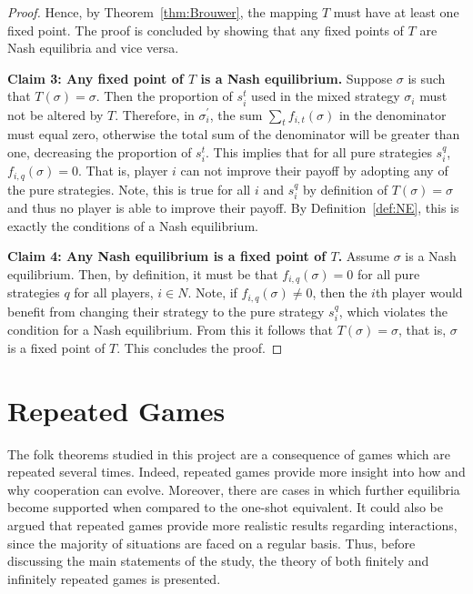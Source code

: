 \begin{proof}
    Hence, by Theorem~\ref{thm:Brouwer}, the mapping \(T\) must have at least
    one fixed point. The proof is concluded by showing that any fixed points of
    \(T\) are Nash equilibria and vice versa. 

    \textbf{Claim 3: Any fixed point of \(T\) is a Nash equilibrium.}
    Suppose \(\sigma \) is such that \(T(\sigma) = \sigma \). Then the
    proportion of \(s_{i}^{t}\) used in the mixed strategy \(\sigma_{i}\) must
    not be altered by \(T\). Therefore, in \(\sigma_{i}^{\prime}\), the sum
    \(\sum_{t}{f_{i,t}(\sigma)}\) in the denominator must equal zero, otherwise the total sum of the denominator will be greater than one,
    decreasing the proportion of \(s_{i}^{t}\). This implies that for all pure
    strategies \(s_{i}^{q}\), \(f_{i,q}(\sigma)=0\). That is, player \(i\) can not
    improve their payoff by adopting any of the pure strategies. Note, this is
    true for all \(i\) and \(s_{i}^{q}\) by definition of \(T(\sigma) = \sigma
    \) and thus no player is able to improve their payoff. By Definition~\ref{def:NE},
    this is exactly the conditions of a Nash equilibrium.

    \textbf{Claim 4: Any Nash equilibrium is a fixed point of \(T\).}
    Assume \(\sigma \) is a Nash equilibrium. Then, by definition, it must
    be that \(f_{i,q}(\sigma)=0\) for all pure strategies \(q\) for all players,
    \(i \in N\). Note, if \(f_{i,q}(\sigma) \ne 0\), then the
    \(i\)th player would benefit from changing their strategy to the pure
    strategy \(s_{i}^{q}\), which violates the condition for a Nash equilibrium.
    From this it follows that \(T(\sigma) = \sigma \), that is, \(\sigma \) is a
    fixed point of \(T\). This concludes the proof.
\end{proof}

\section{Repeated Games}\label{sec:Repeated_Games}
The folk theorems studied in this project are a consequence of games which are
repeated several times. Indeed, repeated games provide more
insight into how and why cooperation can evolve. Moreover, there are cases in
which further equilibria become supported when compared to the one-shot
equivalent. It could also be argued that repeated games provide more realistic
results regarding interactions, since the majority of situations are faced on a
regular basis. Thus, before discussing the
main statements of the study, the theory of both finitely and infinitely
repeated games is presented.

